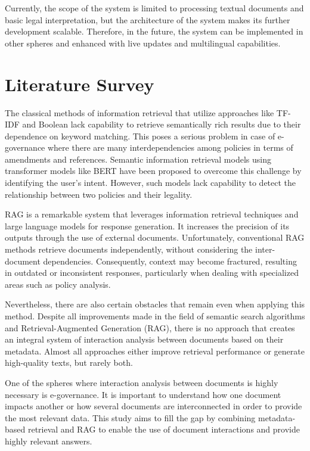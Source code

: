 \documentclass[conference]{IEEEtran}
\begin{document}
Currently, the scope of the system is limited to processing textual documents and basic legal interpretation, but the architecture of the system makes its further development scalable. Therefore, in the future, the system can be implemented in other spheres and enhanced with live updates and multilingual capabilities.

\section{Literature Survey}
The classical methods of information retrieval that utilize approaches like TF-IDF and Boolean lack capability to retrieve semantically rich results due to their dependence on keyword matching. This poses a serious problem in case of e-governance where there are many interdependencies among policies in terms of amendments and references. Semantic information retrieval models using transformer models like BERT have been proposed to overcome this challenge by identifying the user's intent. However, such models lack capability to detect the relationship between two policies and their legality.

RAG is a remarkable system that leverages information retrieval techniques and large language models for response generation. It increases the precision of its outputs through the use of external documents. Unfortunately, conventional RAG methods retrieve documents independently, without considering the inter-document dependencies. Consequently, context may become fractured, resulting in outdated or inconsistent responses, particularly when dealing with specialized areas such as policy analysis.

Nevertheless, there are also certain obstacles that remain even when applying this method. Despite all improvements made in the field of semantic search algorithms and Retrieval-Augmented Generation (RAG), there is no approach that creates an integral system of interaction analysis between documents based on their metadata. Almost all approaches either improve retrieval performance or generate high-quality texts, but rarely both.

One of the spheres where interaction analysis between documents is highly necessary is e-governance. It is important to understand how one document impacts another or how several documents are interconnected in order to provide the most relevant data. This study aims to fill the gap by combining metadata-based retrieval and RAG to enable the use of document interactions and provide highly relevant answers.
\end{document}

